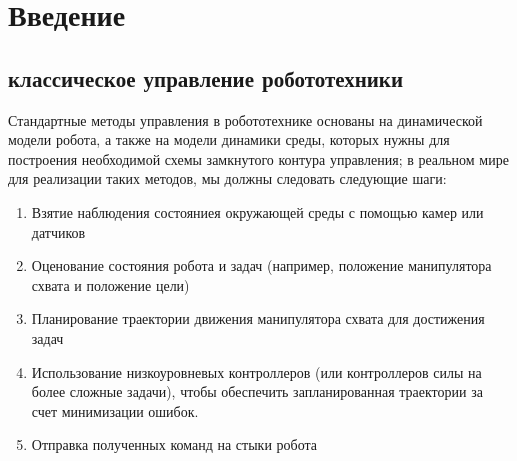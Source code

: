 \documentclass[a4paper,12pt]{article}
\begin{document}
\section{Введение}
\subsection{классическое управление робототехники}
Стандартные методы управления в робототехнике основаны на динамической модели робота, а также на модели динамики среды, которых нужны для построения необходимой схемы замкнутого контура управления; в реальном мире для реализации таких методов, мы должны следовать следующие шаги:
\begin{enumerate}
    \item Взятие наблюдения состояниея окружающей среды с помощью камер или датчиков
    \item Оценование состояния робота и задач (например, положение манипулятора схвата и положение цели) 
    \item Планирование траектории движения манипулятора схвата для достижения задач
    \item Использование низкоуровневых контроллеров (или контроллеров силы на более сложные задачи), чтобы обеспечить запланированная траектории за счет минимизации ошибок.
    \item Отправка полученных команд на стыки робота
\end{enumerate} 
\begin{center}
\end{center}
\end{document}
